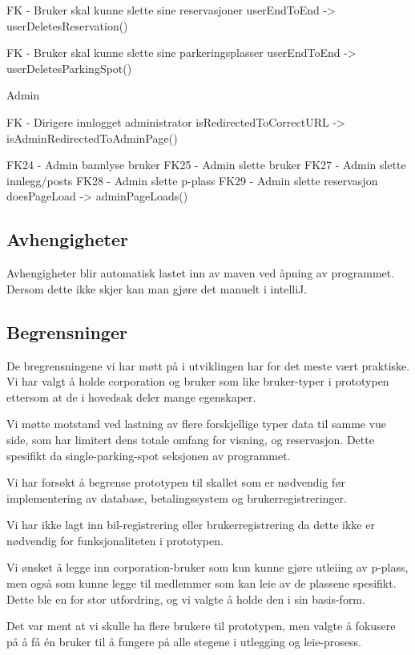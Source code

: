 \documentclass[12pt]{article}
\begin{document}
    FK - Bruker skal kunne slette sine reservasjoner
        userEndToEnd
        -> userDeletesReservation()

    FK - Bruker skal kunne slette sine parkeringsplasser
        userEndToEnd
        -> userDeletesParkingSpot()

    Admin

    FK - Dirigere innlogget administrator
        isRedirectedToCorrectURL
        -> isAdminRedirectedToAdminPage()

    FK24 - Admin bannlyse bruker
    FK25 - Admin slette bruker
    FK27 - Admin slette innlegg/posts
    FK28 - Admin slette p-plass
    FK29 - Admin slette reservasjon
        doesPageLoad
        -> adminPageLoads()


    \subsection{Avhengigheter}
    Avhengigheter blir automatisk lastet inn av maven ved åpning av programmet. Dersom dette ikke skjer kan man gjøre det manuelt i intelliJ.

    \subsection{Begrensninger}
    De bregrensningene vi har møtt på i utviklingen har for det meste vært praktiske. Vi har valgt å holde corporation og bruker som like bruker-typer i prototypen ettersom at de i hovedsak deler mange egenskaper.
    
    Vi møtte motstand ved lastning av flere forskjellige typer data til samme vue side, som har limitert dens totale omfang for visning, og reservasjon. Dette spesifikt da single-parking-spot seksjonen av programmet.
    
    Vi har forsøkt å begrense prototypen til skallet som er nødvendig før implementering av database, betalingssystem og brukerregistreringer.
    
    Vi har ikke lagt inn bil-registrering eller brukerregistrering da dette ikke er nødvendig for funksjonaliteten i prototypen. 
    
    Vi ønsket å legge inn corporation-bruker som kun kunne gjøre utleiing av p-plass, men også som kunne legge til medlemmer som kan leie av de plassene spesifikt. Dette ble en for stor utfordring, og vi valgte å holde den i sin basis-form.
    
    Det var ment at vi skulle ha flere brukere til prototypen, men valgte å fokusere på å få én bruker til å fungere på alle stegene i utlegging og leie-prosess.
    
\end{document}
